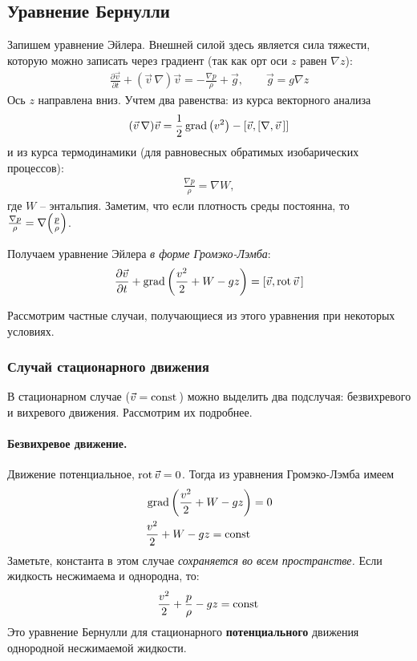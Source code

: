 \subsection{Уравнение Бернулли}
Запишем уравнение Эйлера. Внешней силой здесь является сила тяжести, которую можно записать через градиент (так как орт оси $z$ равен $\nabla z$): 
\begin{align*}
\frac { \partial \vec{v} } { \partial t } + ( \vec{v}\,\nabla ) \vec{v} = - \frac { \nabla p } { \rho } + \vec { g }, \qquad
\vec { g } = g \nabla z
\end{align*}
Ось $z$ направлена вниз. Учтем два равенства: из курса векторного анализа
\begin{equation}
	(\vec {v}\, \nabla ) \vec{v} = \frac12\operatorname{grad}\qty(v^2) - \qty[ \vec{v} , [\nabla , \vec{v}\,]]
\end{equation}
 и из курса термодинамики (для равновесных обратимых изобарических процессов):
\begin{align*}
\frac { \nabla p } { \rho } = \nabla W,
\end{align*}
где $W$ -- энтальпия. Заметим, что если плотность среды постоянна, то $\frac{\nabla p}{\rho}=\nabla\qty(\frac{p}{\rho})$.

Получаем уравнение Эйлера \textit{в форме Громэко-Лэмба}:
\begin{align*}
\frac { \partial \vec{v} } { \partial t } +\operatorname{grad} \left( \frac { v ^ { 2 } } { 2 } + W - g z \right) = [ \vec{v} , \operatorname{rot} \vec{v}\,]
\end{align*}

Рассмотрим частные случаи, получающиеся из этого уравнения при некоторых условиях.

\subsubsection{Случай стационарного движения}
В стационарном случае ($\vec{v}=\mathrm{const}\,$) можно выделить два подслучая: безвихревого и вихревого движения. Рассмотрим их подробнее.

\paragraph{Безвихревое движение.}
Движение потенциальное, $\operatorname{rot} \vec{v}=0$. 		Тогда из уравнения Громэко-Лэмба имеем
\begin{align*}
&\operatorname{grad} \left( \frac { v ^ { 2 } } { 2 } + W - g z \right) = 0 \\
& \frac { v ^ { 2 } } { 2 } + W - g z = \mathrm{const}\,
\end{align*}
Заметьте, константа в этом случае \textit{сохраняется во всем пространстве.} Если жидкость несжимаема и однородна, то:
\begin{align*}
\frac { v ^ { 2 } } { 2 } + \frac { p } { \rho } - g z = \mathrm{const}\,
\end{align*}
Это уравнение Бернулли для стационарного \textbf{потенциального} движения однородной несжимаемой жидкости.

